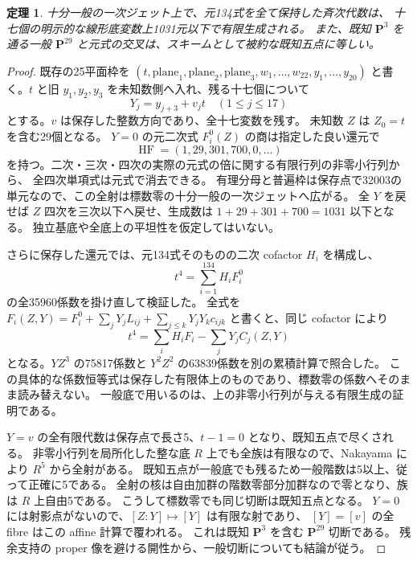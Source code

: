 \documentclass[11pt,a4paper]{ltjsarticle}
\newcommand{\PP}{\mathbf P}
\newtheorem{theorem}{定理}[section]
\theoremstyle{remark}
\begin{document}
\begin{theorem}\label{thm:seventeen-base-v62}
十分一般の一次ジェット上で、元134式を全て保持した斉次代数は、
十七個の明示的な線形底変数上1031元以下で有限生成される。
また、既知 $\PP^3$ を通る一般 $\PP^{29}$ と元式の交叉は、スキームとして被約な既知五点に等しい。
\end{theorem}
\begin{proof}
既存の25平面枠を
$(t,\mathrm{plane}_1,\mathrm{plane}_2,\mathrm{plane}_3,w_1,\ldots,w_{22},y_1,\ldots,y_{20})$
と書く。$t$ と旧 $y_1,y_2,y_3$ を未知数側へ入れ、残る十七個について
\[
 Y_j=y_{j+3}+v_jt\quad(1\le j\le17)
\]
とする。$v$ は保存した整数方向であり、全十七変数を残す。
未知数 $Z$ は $Z_0=t$ を含む29個となる。
$Y=0$ の元二次式 $F_i^0(Z)$ の商は指定した良い還元で
\[
 \operatorname{HF}=(1,29,301,700,0,\ldots)
\]
を持つ。二次・三次・四次の実際の元式の倍に関する有限行列の非零小行列から、
全四次単項式は元式で消去できる。
有理分母と普遍枠は保存点で32003の単元なので、この全射は標数零の十分一般の一次ジェットへ広がる。
全 $Y$ を戻せば $Z$ 四次を三次以下へ戻せ、生成数は $1+29+301+700=1031$ 以下となる。
独立基底や全底上の平坦性を仮定してはいない\cite{seventeen-base-v62}。

さらに保存した還元では、元134式そのものの二次 cofactor $H_i$ を構成し、
\[
 t^4=\sum_{i=1}^{134}H_iF_i^0
\]
の全35960係数を掛け直して検証した。
全式を $F_i(Z,Y)=F_i^0+\sum_jY_jL_{ij}+\sum_{j\le k}Y_jY_kc_{ijk}$ と書くと、同じ cofactor により
\[
 t^4=\sum_iH_iF_i-\sum_jY_jC_j(Z,Y)
\]
となる。$Y Z^3$ の75817係数と $Y^2 Z^2$ の63839係数を別の累積計算で照合した。
この具体的な係数恒等式は保存した有限体上のものであり、標数零の係数へそのまま読み替えない。
一般底で用いるのは、上の非零小行列が与える有限生成の証明である。

$Y=v$ の全有限代数は保存点で長さ5、$t-1=0$ となり、既知五点で尽くされる。
非零小行列を局所化した整な底 $R$ 上でも全族は有限なので、Nakayama により $R^5$ から全射がある。
既知五点が一般底でも残るため一般階数は5以上、従って正確に5である。
全射の核は自由加群の階数零部分加群なので零となり、族は $R$ 上自由5である。
こうして標数零でも同じ切断は既知五点となる。
$Y=0$ には射影点がないので、$[Z:Y]\mapsto[Y]$ は有限な射であり、
$[Y]=[v]$ の全 fibre はこの affine 計算で覆われる。
これは既知 $\PP^3$ を含む $\PP^{29}$ 切断である。
残余支持の proper 像を避ける開性から、一般切断についても結論が従う。
\end{proof}
\end{document}
